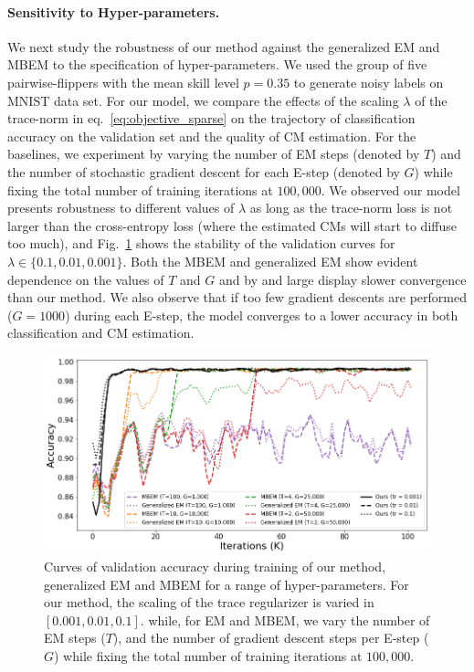 \paragraph{Sensitivity to Hyper-parameters.} 
We next study the robustness of our method against the generalized EM and MBEM to the specification of hyper-parameters. We used the group of five pairwise-flippers with the mean skill level $p=0.35$ to generate noisy labels on MNIST data set. For our model, we compare the effects of the scaling $\lambda$ of the trace-norm in eq.~\ref{eq:objective_sparse} on the trajectory of classification accuracy on the validation set and the quality of CM estimation. For the baselines, we experiment by varying the number of EM steps (denoted by $T$) and the number of stochastic gradient descent for each E-step (denoted by $G$) while fixing the total number of training iterations at $100,000$. We observed our model presents robustness to different values of $\lambda$ as long as the trace-norm loss is not larger than the cross-entropy loss (where the estimated CMs will start to diffuse too much), and Fig.~\ref{fig:robustness_to_hyperparams} shows the stability of the validation curves for $\lambda \in \{0.1, 0.01, 0.001\}$. Both the MBEM and generalized EM show evident dependence on the values of $T$ and $G$ and by and large display slower convergence than our method. We also observe that if too few gradient descents are performed ($G = 1000$) during each E-step, the model converges to a lower accuracy in both classification and CM estimation.

\begin{figure}[ht]
	\centering
	\includegraphics[width=0.97\linewidth]{chapter_4/figures/figures_new/figure_5.png}
	\caption{\small Curves of validation accuracy during training of our method, generalized EM and MBEM for a range of hyper-parameters. For our method, the scaling of the trace regularizer is varied in $[0.001, 0.01, 0.1]$. while, for EM and MBEM, we vary the number of EM steps ($T$), and the number of gradient descent steps per E-step ($G$) while fixing the total number of training iterations at $100,000$.}
	\label{fig:robustness_to_hyperparams}
\end{figure}




